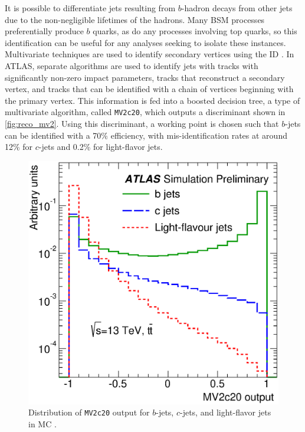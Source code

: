 It is possible to differentiate jets resulting from $b$-hadron decays from other jets due to the non-negligible lifetimes of the hadrons. Many \ac{BSM} processes preferentially produce $b$ quarks, as do any processes involving top quarks, so this identification can be useful for any analyses seeking to isolate these instances. Multivariate techniques are used to identify secondary vertices using the \ac{ID} \cite{ATL-PHYS-PUB-2015-022}. In \ac{ATLAS}, separate algorithms are used to identify jets with tracks with significantly non-zero impact parameters, tracks that reconstruct a secondary vertex, and tracks that can be identified with a chain of vertices beginning with the primary vertex. This information is fed into a boosted decision tree, a type of multivariate algorithm, called \texttt{MV2c20}, which outputs a discriminant shown in \autoref{fig:reco_mv2}. Using this discriminant, a working point is chosen such that $b$-jets can be identified with a 70\% efficiency, with mis-identification rates at around 12\% for $c$-jets and 0.2\% for light-flavor jets.

\begin{centering}
\begin{figure}[!hbt]
\myfloatalign
\includegraphics[width=.9\linewidth]{figures/reco/fig_08.eps}
\caption{ Distribution of \texttt{MV2c20} output for $b$-jets, $c$-jets, and light-flavor jets in \ttbar \ac{MC} \cite{ATL-PHYS-PUB-2015-022}. }
\label{fig:reco_mv2}
\end{figure}
\end{centering}

